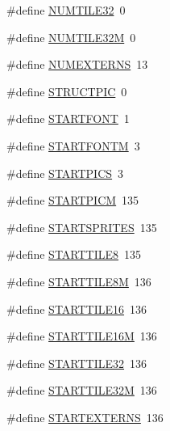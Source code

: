 \begin{DoxyCompactItemize}
\item 
\#define \hyperlink{GFXV__WL6_8H_a63d2fe64d989433ecd39d601070bfe04}{NUMTILE32}~0
\item 
\#define \hyperlink{GFXV__WL6_8H_ac85fdf79a513ee60e10cbb347ba5129f}{NUMTILE32M}~0
\item 
\#define \hyperlink{GFXV__WL6_8H_abb86554baf24d8863e54bf20d68120b5}{NUMEXTERNS}~13
\item 
\#define \hyperlink{GFXV__WL6_8H_aa325a0ff072fddd0404951d4f486fcaa}{STRUCTPIC}~0
\item 
\#define \hyperlink{GFXV__WL6_8H_a91e546d8307de206a3822f7ea9064cb2}{STARTFONT}~1
\item 
\#define \hyperlink{GFXV__WL6_8H_a8e97342cc14d7aed1d20b6ff859f22ef}{STARTFONTM}~3
\item 
\#define \hyperlink{GFXV__WL6_8H_aaf17bc60cff0a0236cafed9026641531}{STARTPICS}~3
\item 
\#define \hyperlink{GFXV__WL6_8H_abd418cd2e72de01524b8400b58ad8273}{STARTPICM}~135
\item 
\#define \hyperlink{GFXV__WL6_8H_a08f15ca2b66024c7df43a601df18e33a}{STARTSPRITES}~135
\item 
\#define \hyperlink{GFXV__WL6_8H_a63a36c8955b74ee16ba0fc61f4d62478}{STARTTILE8}~135
\item 
\#define \hyperlink{GFXV__WL6_8H_a56df7bfae7e081f1fe22c67f356c0f12}{STARTTILE8M}~136
\item 
\#define \hyperlink{GFXV__WL6_8H_adde5c841b7c315dca1c114be851a14bf}{STARTTILE16}~136
\item 
\#define \hyperlink{GFXV__WL6_8H_a8158cbe2ebd8e9f311fd7637be063176}{STARTTILE16M}~136
\item 
\#define \hyperlink{GFXV__WL6_8H_afdb080cedc6a487f761df7481033e345}{STARTTILE32}~136
\item 
\#define \hyperlink{GFXV__WL6_8H_a04e773bd033b5375cb82a2bc5142eb3a}{STARTTILE32M}~136
\item 
\#define \hyperlink{GFXV__WL6_8H_a4bab9c7dbc3408ece8bf42a298f4a0ad}{STARTEXTERNS}~136
\end{DoxyCompactItemize}
